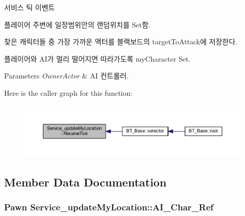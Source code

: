 서비스 틱 이벤트 

플레이어 주변에 일정범위안의 랜덤위치를 Set함.

찾은 캐릭터들 중 가장 가까운 액터를 블랙보드의 target\+To\+Attack에 저장한다.

플레이어와 A\+I가 멀리 떨어지면 따라가도록 my\+Character Set. 
\begin{DoxyParams}{Parameters}
{\em Owner\+Actor} & AI 컨트롤러. \\
\hline
\end{DoxyParams}


Here is the caller graph for this function\+:\nopagebreak
\begin{figure}[H]
\begin{center}
\leavevmode
\includegraphics[width=350pt]{class_service__update_my_location_a2c2f90d92234520772c3a0108f148626_icgraph}
\end{center}
\end{figure}




\subsection{Member Data Documentation}
\subsubsection[{\texorpdfstring{A\+I\+\_\+\+Char\+\_\+\+Ref}{AI_Char_Ref}}]{\setlength{\rightskip}{0pt plus 5cm}Pawn Service\+\_\+update\+My\+Location\+::\+A\+I\+\_\+\+Char\+\_\+\+Ref\hspace{0.3cm}{\ttfamily [private]}}\hypertarget{class_service__update_my_location_a6d13896af22d8464dc24800bfd498c8a}{}\label{class_service__update_my_location_a6d13896af22d8464dc24800bfd498c8a}
